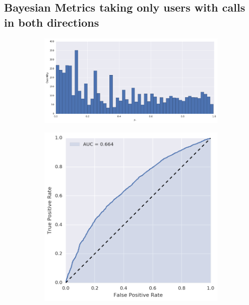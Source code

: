 \subsection{Bayesian Metrics taking only users with calls in both directions}
\setcounter{topnumber}{8}
\setcounter{bottomnumber}{8}
\setcounter{totalnumber}{8}

\begin{figure}[p]
\centering
\begin{subfigure}[t]{\textwidth}
	\centering
	\includegraphics[height=.20\textheight]{figures/bayes/least1/hist_calls.png}
\end{subfigure}
\begin{subfigure}[b]{.49\textwidth}
	\raggedleft{}
	\includegraphics[height=.20\textheight]{figures/bayes/least1/roc_calls.png}

\end{subfigure}
\end{figure}
